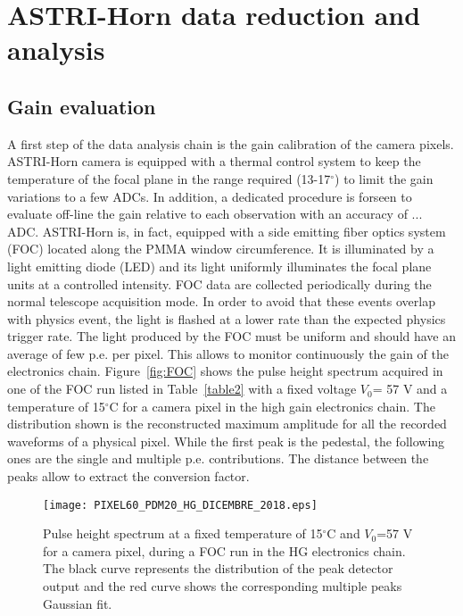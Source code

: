 \section{ASTRI-Horn data reduction and analysis} 
\label{sect:astridata}

\subsection{Gain evaluation}
\label{subs:gain}

A first step of the data analysis chain is the gain calibration of the camera pixels.
ASTRI-Horn camera is equipped with a thermal control system to keep the temperature of the focal plane in the  range required (13-17$^\circ$) to limit the gain variations to a few ADCs. In addition, a dedicated procedure is forseen to evaluate off-line the gain relative to each observation with an accuracy of ... ADC. ASTRI-Horn is, in fact, equipped with a side emitting fiber optics system (FOC) located along the PMMA window circumference. It is illuminated by a light emitting diode (LED) and its light uniformly illuminates the focal plane units at a controlled intensity. FOC data are collected periodically during the normal telescope acquisition mode.
In order to avoid that these events overlap with physics event, the light is flashed  at a lower rate than the expected physics trigger rate. The light produced by the FOC must be uniform and should have an average of few p.e. per pixel. This allows to monitor continuously the gain of the electronics chain. Figure~\ref{fig:FOC} shows the pulse height spectrum acquired in one of the FOC run listed in Table~\ref{table2} with a fixed voltage $V_{0}$= 57 V  and a temperature of 15$^\circ$C for a camera pixel in the high gain electronics chain. 
The distribution shown is the reconstructed maximum amplitude for all the 
recorded waveforms of a physical pixel. While the first peak is the pedestal, the following 
ones are the single and multiple p.e. contributions. The distance between 
the peaks allow to extract the conversion factor.\\
\begin{figure*}[ht!!]
\centering
\texttt{[image: PIXEL60\_PDM20\_HG\_DICEMBRE\_2018.eps]}
\vspace{0.5cm}
\caption{ Pulse height spectrum at a fixed temperature of 15$^\circ$C
and $V_{0}$=57 V for a camera pixel, during a FOC run in the HG electronics chain. 
The black curve represents the distribution of the peak detector output and the red curve shows the corresponding
multiple peaks Gaussian fit.}
\label{fig1}
\end{figure*}

